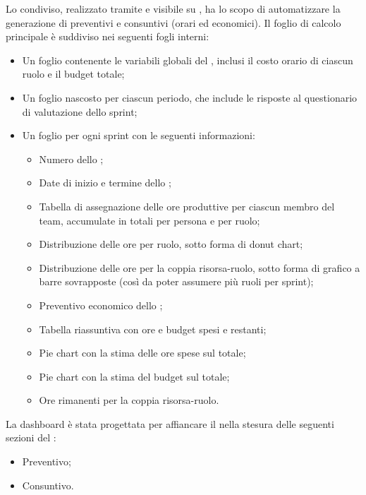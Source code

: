 Lo  condiviso, realizzato tramite  e visibile su , ha lo scopo di automatizzare la generazione di preventivi e consuntivi (orari ed economici). Il foglio di calcolo principale è suddiviso nei seguenti fogli interni:
\begin{itemize}
  \item Un foglio contenente le variabili globali del \PdP, inclusi il costo orario di ciascun ruolo e il budget totale;
  \item Un foglio nascosto per ciascun periodo, che include le risposte al questionario di valutazione dello sprint;
  \item Un foglio per ogni sprint con le seguenti informazioni:
  \begin{itemize}
    \item Numero dello ;
    \item Date di inizio e termine dello ;
    \item Tabella di assegnazione delle ore produttive per ciascun membro del team, accumulate in totali per persona e per ruolo;
    \item Distribuzione delle ore per ruolo, sotto forma di donut chart;
    \item Distribuzione delle ore per la coppia risorsa-ruolo, sotto forma di grafico a barre sovrapposte (così da poter assumere più ruoli per sprint);
    \item Preventivo economico dello ;
    \item Tabella riassuntiva con ore e budget spesi e restanti;
    \item Pie chart con la stima delle ore spese sul totale;
    \item Pie chart con la stima del budget sul totale;
    \item Ore rimanenti per la coppia risorsa-ruolo.
  \end{itemize}
\end{itemize}
\vspace{0.5\baselineskip}
\par La dashboard è stata progettata per affiancare il \Responsabile{} nella stesura delle seguenti sezioni del \PdP:
\begin{itemize}
  \item Preventivo;
  \item Consuntivo.
\end{itemize}

